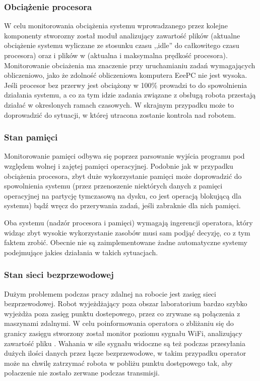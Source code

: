 \subsubsection{Obciążenie procesora}

W celu monitorowania obciążenia systemu wprowadzanego przez kolejne komponenty
stworozny został moduł analizujący zawartość plików  (aktualne
obciążenie systemu wyliczane ze stosunku czasu ,,idle'' do całkowitego czasu
procesora) oraz  i plików w 
(aktualna i maksymalna prędkość procesora). Monitorowanie obciażenia ma
znaczenie przy uruchamianiu zadań wymagających obliczeniowo, jako że zdolność
obliczeniowa komputera EeePC nie jest wysoka. Jeśli procesor bez przerwy jest
obciążony w 100\% prowadzi to do spowolnienia działania systemu, a co za tym
idzie zadania związane z obsługą robota przestają działać w okreslonych ramach
czasowych. W skrajnym przypadku może to doprowadzić do sytuacji, w której
utracona zostanie kontrola nad robotem.

\subsubsection{Stan pamięci}

Monitorowanie pamięci odbywa się poprzez parsowanie wyjścia programu 
pod względem wolnej i zajętej pamięci operacyjnej. Podobnie jak w przypadku
obciążenia procesora, zbyt duże wykorzystanie pamięci może doprowadzić do
spowolnienia systemu (przez przenoszenie niektórych danych z pamięci
operacyjnej na partycję tymczasową na dysku, co jest operacją blokującą dla
systemu) bądź wręcz do przerywania zadań, jeśli zabraknie dla nich pamięci.

Oba systemu (nadzór procesora i pamięci) wymagają ingerencji operatora, który
widząc zbyt wysokie wykorzystanie zasobów musi sam podjąć decyzję, co z tym
faktem zrobić. Obecnie nie są zaimplementowane żadne automatyczne systemy
podejmujące jakies działania w takich sytuacjach.

\subsubsection{Stan sieci bezprzewodowej}

Dużym problemem podczas pracy zdalnej na robocie jest zasięg sieci
bezprzewodowej. Robot wyjeżdżający poza obszar laboratorium bardzo szybko
wyjeżdża poza zasięg punktu dostepowego, przez co zrywane są połączenia z
maszynami zdalnymi. W celu poinformowania operatora o zbliżaniu się do granicy
zasięgu stworzony został monitor poziomu sygnału WiFi, analizujący zawartość
pliku . Wahania w sile sygnału widoczne są też podczas
przesyłania dużych ilości danych przez łącze bezprzewodowe, w takim przypadku
operator może na chwilę zatrzymać robota w pobliżu punktu dostępowego tak, aby
połaczenie nie zostało zerwane podczas transmisji.

